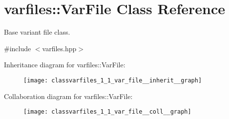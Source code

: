 \hypertarget{classvarfiles_1_1_var_file}{}\section{varfiles\+:\+:Var\+File Class Reference}
\label{classvarfiles_1_1_var_file}


Base variant file class.  




{\ttfamily \#include $<$varfiles.\+hpp$>$}



Inheritance diagram for varfiles\+:\+:Var\+File\+:\nopagebreak
\begin{figure}[H]
\begin{center}
\leavevmode
\texttt{[image: classvarfiles\_1\_1\_var\_file\_\_inherit\_\_graph]}
\end{center}
\end{figure}


Collaboration diagram for varfiles\+:\+:Var\+File\+:\nopagebreak
\begin{figure}[H]
\begin{center}
\leavevmode
\texttt{[image: classvarfiles\_1\_1\_var\_file\_\_coll\_\_graph]}
\end{center}
\end{figure}
